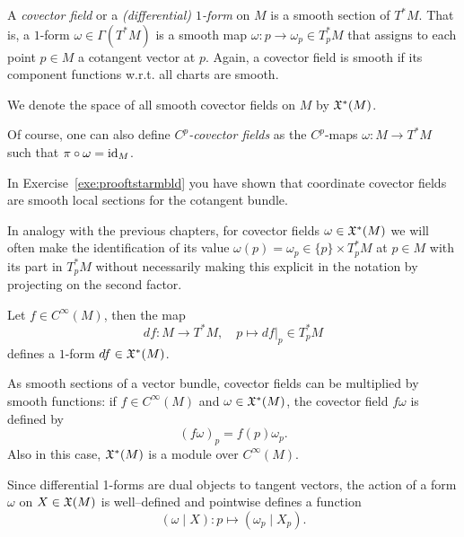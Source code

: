 \begin{definition}\label{def:covfield}
	A \emph{covector field} or a \emph{(differential) $1$-form} on $M$ is a smooth section of $T^*M$.
	That is, a $1$-form $\omega\in\Gamma(T^*M)$ is a smooth map $\omega: p \to \omega_p \in T_p^*M$ that assigns to each point $p\in M$ a cotangent vector at $p$.
	Again, a covector field is smooth if its component functions w.r.t. all charts are smooth.

	We denote the space of all smooth covector fields on $M$ by $\mathfrak{X}^*(M)$.

	Of course, one can also define \emph{$C^p$-covector fields} as the $C^p$-maps $\omega:M\to T^*M$ such that $\pi\circ\omega = \operatorname{id}_M$.
\end{definition}

\begin{remark}
	In Exercise~\ref{exe:prooftstarmbld} you have shown that coordinate covector fields are smooth local sections for the cotangent bundle.
\end{remark}

In analogy with the previous chapters, for covector fields $\omega\in\mathfrak{X}^*(M)$ we will often make the identification of its value $\omega(p) = \omega_p \in \{p\}\times T^*_p M$ at $p\in M$ with its part in $T_p^*M$ without necessarily making this explicit in the notation by projecting on the second factor.

\begin{example}
	Let $f\in C^\infty(M)$, then the map
	\begin{equation}
		df : M \to T^*M, \quad p \mapsto df|_p \in T^*_p M
	\end{equation}
	defines a $1$-form $df\in\mathfrak{X}^*(M)$.
\end{example}

As smooth sections of a vector bundle, covector fields can be multiplied by smooth functions: if $f\in C^\infty(M)$ and $\omega\in\mathfrak{X}^*(M)$, the covector field $f\omega$ is defined by
\begin{equation}
	(f\omega)_p = f(p)\omega_p.
\end{equation}
Also in this case, $\mathfrak{X}^*(M)$ is a module over $C^\infty(M)$.

Since differential 1-forms are dual objects to tangent vectors, the action of a form $\omega$ on $X\in\mathfrak{X}(M)$ is well--defined and pointwise defines a function
\begin{equation}
	(\omega \mid X) : p \mapsto (\omega_p \mid X_p).
\end{equation}

